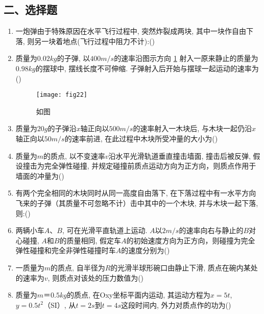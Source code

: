 \subsection*{二、选择题}
\begin{enumerate}
    \item 一炮弹由于特殊原因在水平飞行过程中, 突然炸裂成两块, 其中一块作自由下落, 则另一块着地点(飞行过程中阻力不计):(\hspace{1pc})     
    \item 质量为$0.02kg$的子弹, 以$400 m/s$的速率沿图示方向 \ref{fig:22} 射入一原来静止的质量为$0.98kg$的摆球中, 摆线长度不可伸缩. 子弹射入后开始与摆球一起运动的速率为(\hspace{1pc})
    \begin{figure}[H]
        \centering
        \texttt{[image: fig22]}
            \caption{如图}\label{fig:22}
    \end{figure}
    \item 质量为$20 g$的子弹沿$x$轴正向以$500 m/s$的速率射入一木块后, 与木块一起仍沿$x$轴正向以$50 m/s$的速率前进, 在此过程中木块所受冲量的大小为(\hspace{1pc})                                                        
    \item 质量为$m$的质点, 以不变速率$v$沿水平光滑轨道垂直撞击墙面, 撞击后被反弹, 假设撞击为完全弹性碰撞, 并规定碰撞前质点运动方向为正方向，则质点作用于墙面的冲量为(\hspace{1pc})

    \item 有两个完全相同的木块同时从同一高度自由落下, 在下落过程中有一水平方向飞来的子弹（其质量不可忽略不计）击中其中的一个木块, 并与木块一起下落, 则:(\hspace{1pc})  
   
   \item  两辆小车$A$、$B$, 可在光滑平直轨道上运动. $A$以$2 m/s$的速率向右与静止的$B$对心碰撞, $A$和$B$的质量相同, 假定车$A$的初始速度方向为正方向，则碰撞为完全弹性碰撞和完全非弹性碰撞时车$A$的速度分别为(\hspace{1pc})                         
    \item 一质量为$m$的质点, 自半径为$R$的光滑半球形碗口由静止下滑, 质点在碗内某处的速率为$v$, 则质点对该处的压力数值为(\hspace{1pc})                
    \item 质量为$m＝0.5kg$的质点, 在Oxy坐标平面内运动, 其运动方程为$x=5t$, $y=0.5t^2$（SI）, 从$t=2s$到$t=4s$这段时间内, 外力对质点作的功为(\hspace{1pc})


\end{enumerate}
